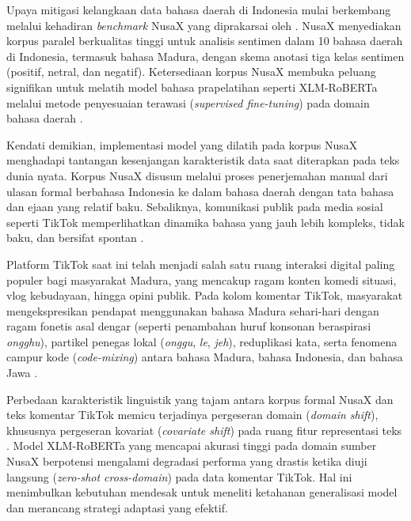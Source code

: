 Upaya mitigasi kelangkaan data bahasa daerah di Indonesia mulai berkembang melalui kehadiran \textit{benchmark} NusaX yang diprakarsai oleh \citet{winata2023nusax}. NusaX menyediakan korpus paralel berkualitas tinggi untuk analisis sentimen dalam 10 bahasa daerah di Indonesia, termasuk bahasa Madura, dengan skema anotasi tiga kelas sentimen (positif, netral, dan negatif). Ketersediaan korpus NusaX membuka peluang signifikan untuk melatih model bahasa prapelatihan seperti XLM-RoBERTa melalui metode penyesuaian terawasi (\textit{supervised fine-tuning}) pada domain bahasa daerah \citep{darnoto2026language, winata2023nusax}.

Kendati demikian, implementasi model yang dilatih pada korpus NusaX menghadapi tantangan kesenjangan karakteristik data saat diterapkan pada teks dunia nyata. Korpus NusaX disusun melalui proses penerjemahan manual dari ulasan formal berbahasa Indonesia ke dalam bahasa daerah dengan tata bahasa dan ejaan yang relatif baku. Sebaliknya, komunikasi publik pada media sosial seperti TikTok memperlihatkan dinamika bahasa yang jauh lebih kompleks, tidak baku, dan bersifat spontan \citep{luther2026analisis, saputra2026reaksi}.

Platform TikTok saat ini telah menjadi salah satu ruang interaksi digital paling populer bagi masyarakat Madura, yang mencakup ragam konten komedi situasi, vlog kebudayaan, hingga opini publik. Pada kolom komentar TikTok, masyarakat mengekspresikan pendapat menggunakan bahasa Madura sehari-hari dengan ragam fonetis asal dengar (seperti penambahan huruf konsonan beraspirasi \textit{ongghu}), partikel penegas lokal (\textit{onggu}, \textit{le}, \textit{jeh}), reduplikasi kata, serta fenomena campur kode (\textit{code-mixing}) antara bahasa Madura, bahasa Indonesia, dan bahasa Jawa \citep{arifin2026heuristic, firmansyah2021klasifikasi, syauri2026analisis}.

Perbedaan karakteristik linguistik yang tajam antara korpus formal NusaX dan teks komentar TikTok memicu terjadinya pergeseran domain (\textit{domain shift}), khususnya pergeseran kovariat (\textit{covariate shift}) pada ruang fitur representasi teks \citep{aribowo2021cross, zulkifli2025indonesian}. Model XLM-RoBERTa yang mencapai akurasi tinggi pada domain sumber NusaX berpotensi mengalami degradasi performa yang drastis ketika diuji langsung (\textit{zero-shot cross-domain}) pada data komentar TikTok. Hal ini menimbulkan kebutuhan mendesak untuk meneliti ketahanan generalisasi model dan merancang strategi adaptasi yang efektif.

